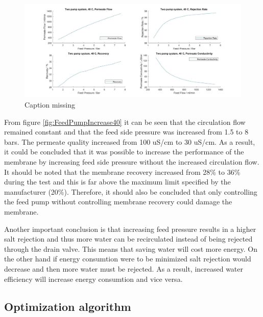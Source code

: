 \begin{figure}[H]
    \centering
    \includegraphics[width=1.1\textwidth]{FeedPumpIncrease40Key}
    \caption{Caption missing}
    \label{fig:FeedPumpIncrease40Key}
\end{figure}

From figure \ref{fig:FeedPumpIncrease40} it can be seen that the circulation flow remained constant and that the feed side pressure was increased from 1.5 to 8 bars. The permeate quality increased from 100 uS/cm to 30 uS/cm. As a result, it could be concluded that it was possible to increase the performance of the membrane by increasing feed side pressure without the increased circulation flow. It should be noted that the membrane recovery increased from 28\% to 36\% during the test and this is far above the maximum limit specified by the manufacturer (20\%). Therefore, it should also be concluded that only controlling the feed pump without controlling membrane recovery could damage the membrane. 

Another important conclusion is that increasing feed pressure results in a higher salt rejection and thus more water can be recirculated instead of being rejected through the drain valve. This means that saving water will cost more energy. On the other hand if energy consumtion were to be minimized salt rejection would decrease and then more water must be rejected. As a result, increased water efficiency will increase energy consumtion and vice versa.  

 
\newpage
\subsection{Optimization algorithm}

